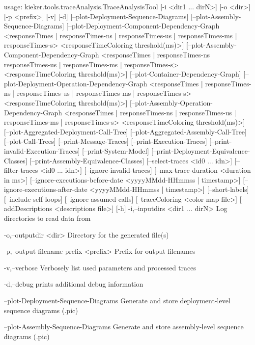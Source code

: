 usage: kieker.tools.traceAnalysis.TraceAnalysisTool [-i <dir1 ... dirN>]
       [-o <dir>] [-p <prefix>] [-v] [-d]
       [--plot-Deployment-Sequence-Diagrams]
       [--plot-Assembly-Sequence-Diagrams]
       [--plot-Deployment-Component-Dependency-Graph <responseTimes |
       responseTimes-ns | responseTimes-us | responseTimes-ms |
       responseTimes-s> <responseTimeColoring threshold(ms)>]
       [--plot-Assembly-Component-Dependency-Graph <responseTimes |
       responseTimes-ns | responseTimes-us | responseTimes-ms |
       responseTimes-s> <responseTimeColoring threshold(ms)>]
       [--plot-Container-Dependency-Graph]
       [--plot-Deployment-Operation-Dependency-Graph <responseTimes |
       responseTimes-ns | responseTimes-us | responseTimes-ms |
       responseTimes-s> <responseTimeColoring threshold(ms)>]
       [--plot-Assembly-Operation-Dependency-Graph <responseTimes |
       responseTimes-ns | responseTimes-us | responseTimes-ms |
       responseTimes-s> <responseTimeColoring threshold(ms)>]
       [--plot-Aggregated-Deployment-Call-Tree]
       [--plot-Aggregated-Assembly-Call-Tree] [--plot-Call-Trees]
       [--print-Message-Traces] [--print-Execution-Traces]
       [--print-invalid-Execution-Traces] [--print-System-Model]
       [--print-Deployment-Equivalence-Classes]
       [--print-Assembly-Equivalence-Classes] [--select-traces <id0 ...
       idn>] [--filter-traces <id0 ... idn>] [--ignore-invalid-traces]
       [--max-trace-duration <duration in ms>]
       [--ignore-executions-before-date <yyyyMMdd-HHmmss | timestamp>]
       [--ignore-executions-after-date <yyyyMMdd-HHmmss | timestamp>]
       [--short-labels] [--include-self-loops] [--ignore-assumed-calls]
       [--traceColoring <color map file>] [--addDescriptions <descriptions
       file>] [-h]
 -i,--inputdirs <dir1 ... dirN>
        Log directories to read data from

 -o,--outputdir <dir>
        Directory for the generated file(s)

 -p,--output-filename-prefix <prefix>
        Prefix for output filenames
        

 -v,--verbose
        Verbosely list used parameters and processed traces

 -d,--debug
        prints additional debug information

    --plot-Deployment-Sequence-Diagrams
        Generate and store deployment-level sequence diagrams (.pic)

    --plot-Assembly-Sequence-Diagrams
        Generate and store assembly-level sequence diagrams (.pic)

